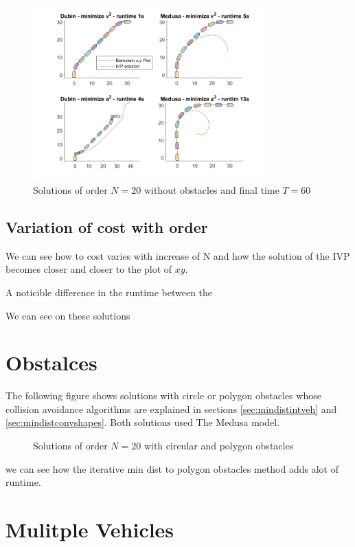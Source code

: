 \begin{figure}[h!]
\centering
\includegraphics[width=0.8\textwidth]{Images/results/noostaclesfigures.png}
\caption{Solutions of order $N=20$ without obstacles and final time $T=60$}
\label{fig:noobstaclescosts}
\end{figure}

\subsection{Variation of cost with order}
\par We can see how to cost varies with increase of N and how the solution of the \ac{IVP} becomes closer and closer to the plot of $xy$.


\par A noticible difference in the runtime between the 

\par We can see on these solutions 

\section{Obstalces}

\par The following figure shows solutions with circle or polygon obstacles whose collision avoidance algorithms are explained in sections \ref{sec:mindistintveh} and \ref{sec:mindistconvshapes}. Both solutions used The Medusa model.

\begin{figure}[h!]
\centering
\missingfigure[figwidth=6cm]{}
\caption{Solutions of order $N=20$ with circular and polygon obstacles}
\label{fig:withobstaclescosts}
\end{figure}

we can see how the iterative min dist to polygon obstacles method adds alot of runtime.



\section{Mulitple Vehicles}





